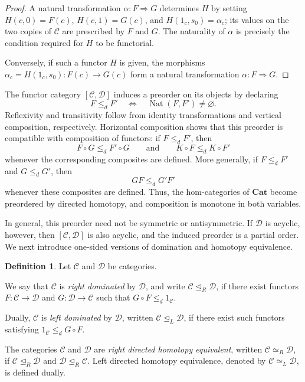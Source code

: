 \documentclass[12pt]{amsart}
\theoremstyle{definition}
\newtheorem{definition}[teo]{Definition}
\theoremstyle{remark}
\numberwithin{figure}{section}%
\newcommand{\CC}{\mathcal{C}}
\newcommand{\Dc}{\mathcal{D}}
\begin{document}
\begin{proof}
A natural transformation \(\alpha\colon F\Rightarrow G\) determines
\(H\) by setting \(H(c,0)=F(c)\), \(H(c,1)=G(c)\), and
\(H(1_c,s_0)=\alpha_c\); its values on the two copies of \(\CC\) are
prescribed by \(F\) and \(G\). The naturality of \(\alpha\) is precisely the
condition required for \(H\) to be functorial.

Conversely, if such a functor \(H\) is given, the morphisms
\(\alpha_c=H(1_c,s_0) \colon \allowbreak F(c)\to G(c)\) form a natural transformation
\(\alpha\colon F\Rightarrow G\).
\end{proof}
The functor category \([\CC,\Dc]\) induces a preorder on its objects by
declaring
\[
F\leq_d F'
\quad\Longleftrightarrow\quad
\operatorname{Nat}(F,F')\neq\varnothing.
\]
Reflexivity and transitivity follow from identity transformations and
vertical composition, respectively. Horizontal composition shows that
this preorder is compatible with composition of functors: if
\(F\leq_d F'\), then
\[
F \circ G\leq_d F'\circ G
\qquad\text{and}\qquad
K\circ F\leq_d K \circ F'
\]
whenever the corresponding composites are defined. More generally, if
\(F\leq_d F'\) and \(G\leq_d G'\), then
\[
GF\leq_d G'F'
\]
whenever these composites are defined. Thus, the hom-categories of
\(\mathbf{Cat}\) become preordered by directed homotopy, and composition
is monotone in both variables.

In general, this preorder need not be symmetric or antisymmetric. If
\(\Dc\) is acyclic, however, then \([\CC,\Dc]\) is also acyclic, and the
induced preorder is a partial order. We next introduce one-sided versions
of domination and homotopy equivalence.

\begin{definition}\label{def:directed_domination}
Let \(\CC\) and \(\Dc\) be categories.

We say that \(\CC\) is \emph{right dominated} by \(\Dc\), and write \(\CC\unlhd_R\Dc\), if there exist functors \(F\colon\CC\to\Dc\) and \(G\colon\Dc\to\CC\) such that \(G\circ F\leq_d1_\CC\).

Dually, \(\CC\) is \emph{left dominated} by \(\Dc\), written
\(\CC\unlhd_L\Dc\), if there exist such functors satisfying
\(1_\CC\leq_dG\circ F\).

The categories \(\CC\) and \(\Dc\) are \emph{right directed homotopy
equivalent}, written \(\CC\simeq_R\Dc\), if
\(\CC\unlhd_R\Dc\) and \(\Dc\unlhd_R\CC\). Left directed homotopy
equivalence, denoted by \(\CC\simeq_L\Dc\), is defined dually.
\end{definition}
\end{document}
